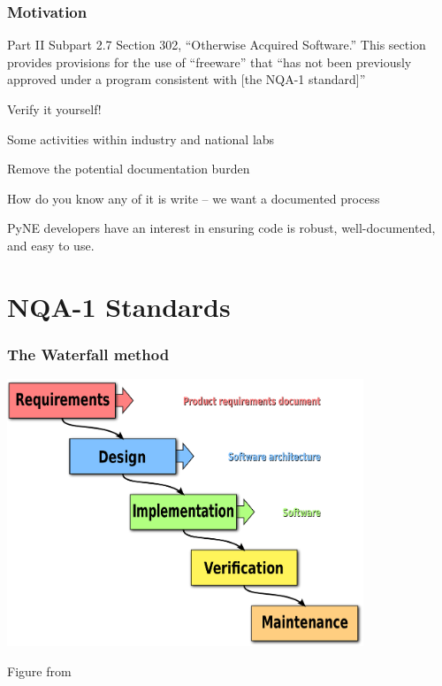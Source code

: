 \documentclass[12pt]{beamer}
\begin{document}
\begin{frame}[fragile]
\frametitle{Motivation}

Part II
Subpart 2.7 Section 302, “Otherwise Acquired Software.”
This section provides provisions for the use of “freeware”
that “has not been previously approved under a program
consistent with [the NQA-1 standard]”

Verify it yourself!

Some activities within industry and national labs

Remove the potential documentation burden

How do you know any of it is write -- we want a documented process

PyNE developers have an interest in ensuring code is robust, well-documented,
and easy to use.

\end{frame}


\section{NQA-1 Standards}

\begin{frame}[fragile]
\frametitle{The Waterfall method \cite{waterfall}}
\centerline{\includegraphics[width=0.8\textwidth]{figures/waterfall.pdf}}
Figure from \cite{waterfall_wiki}
\end{frame}
\end{document}
